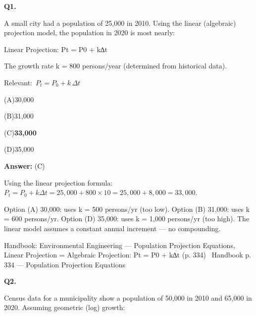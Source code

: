 \documentclass[11pt]{article}
\newcommand{\correct}[1]{\textbf{#1}\;{\color{accent}$\checkmark$}}
\newcommand{\optline}[2]{\par\noindent\hspace{1.2em}(#1)\hspace{0.6em}#2}
\begin{document}
\vspace{10pt}
\filbreak
\textbf{\color{accent}Q1.}\par\vspace{2pt}
A small city had a population of 25,000 in 2010. Using the linear (algebraic) projection model, the population in 2020 is most nearly:

Linear Projection: Pt = P0 + k∆t

The growth rate k = 800 persons/year (determined from historical data).\par\vspace{3pt}
{\small\color{soft}Relevant:}\ $P_t = P_0 + k\,\Delta t$\par\vspace{3pt}
\optline{A}{30,000}
\optline{B}{31,000}
\optline{C}{\correct{33,000}}
\optline{D}{35,000}
\par\vspace{3pt}
\vspace{2pt}\par\noindent\colorbox{boxbg}{\parbox{\dimexpr\linewidth-2\fboxsep\relax}{%
\vspace{2pt}\textbf{Answer:} (C)\par\vspace{2pt}
{\small Using the linear projection formula: $P_t = P_0 + k\Delta t = 25{,}000 + 800\times10 = 25{,}000 + 8{,}000 = 33{,}000$.

Option (A) 30,000: uses k = 500 persons/yr (too low). Option (B) 31,000: uses k = 600 persons/yr. Option (D) 35,000: uses k = 1,000 persons/yr (too high). The linear model assumes a constant annual increment --- no compounding.}\par\vspace{2pt}
{\footnotesize\color{soft}Handbook: Environmental Engineering --- Population Projection Equations, Linear Projection = Algebraic Projection: Pt = P0 + k∆t (p. 334) \textbullet\ Handbook p. 334 --- Population Projection Equations}\vspace{2pt}
}}
\vspace{9pt}
\filbreak
\textbf{\color{accent}Q2.}\par\vspace{2pt}
Census data for a municipality show a population of 50,000 in 2010 and 65,000 in 2020. Assuming geometric (log) growth:
\end{document}

